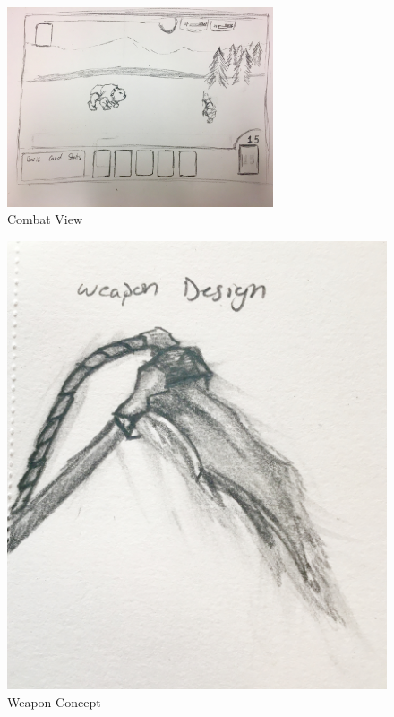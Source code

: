 \documentclass[12pt,titlepage]{article}
\begin{document}
\begin{figure}[H]
    \caption{Combat View}
    \label{fig:combat}
    \centering
    \includegraphics[width=0.7\textwidth]{../../graphics/combat}
\end{figure}

\begin{figure}[H]
    \caption{Weapon Concept}
    \label{fig:weapon_concept}
    \centering
    \includegraphics[width=0.35\textheight]{../../graphics/scythe}
\end{figure}
\end{document}
